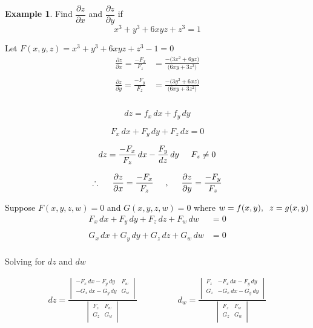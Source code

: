 \documentclass[11pt,a4paper]{article}
\theoremstyle{definition}
\newtheorem{exa}[thm]{Example}
\begin{document}
\begin{exa}


Find $\dfrac{\partial z}{\partial x}$ and $\dfrac{\partial z}{\partial y}$ if $$x^3 + y^3 + 6xyz + z^3 = 1$$


Let $F(x,y,z) = x^3 + y^3 + 6xyz + z^3 - 1 =0$
\begin{align*}
\frac{\partial z}{\partial x} = \frac{-F_x}{F_z}  & = \frac{-\big(3x^2 + 6yz\big)}{\big(6xy + 3z^2\big)}\\\\
\frac{\partial z}{\partial y} = \frac{-F_y}{F_z}  & = \frac{-\big(3y^2 + 6xz\big)}{\big(6xy + 3z^2\big)}\\\\
\end{align*}

$$dz = f_x \,dx + f_y\, dy$$

$$F_x\,dx + F_y\,dy + F_z\,dz = 0$$

$$dz = \frac{-F_x}{F_z}\,dx - \frac{F_y}{dz}\,dy\hspace{0.5cm} F_z \neq 0$$

$$\therefore\hspace{0.5cm} \frac{\partial z}{\partial x} = \frac{-F_x}{F_z}\hspace{0.5cm}, \hspace{0.5cm}\frac{\partial z}{\partial y} =\frac{-F_y}{F_z}$$


Suppose $F(x,y,z,w) = 0$ and $G(x,y,z,w) = 0$ where $w = f(x,y),\hspace{0.2cm} z = g(x,y)$
\begin{align*}
F_x\,dx + F_y\,dy + F_z\,dz + F_w\,dw  & = 0\\\\
G_x\,dx + G_y\,dy + G_z\,dz + G_w\,dw & = 0\\
\end{align*}

Solving for $dz$ and $dw$

\begin{align*}
dz = \frac{
\begin{vmatrix}
-F_x\,dx -F_y\,dy & F_w\\
-G_x\,dx -G_y\,dy & G_w\\
\end{vmatrix}
}{
\begin{vmatrix}
F_z & F_w\\
G_z & G_w\\
\end{vmatrix}
}\hspace{2cm} d_w = 
\frac{
\begin{vmatrix}
F_z & -F_x\,dx - F_y\,dy\\
G_z & -G_x\,dx - G_y\,dy\\
\end{vmatrix}
}{
\begin{vmatrix}
F_z & F_w\\
G_z & G_w\\
\end{vmatrix}
}\\
\end{align*}


\end{exa}
\end{document}
